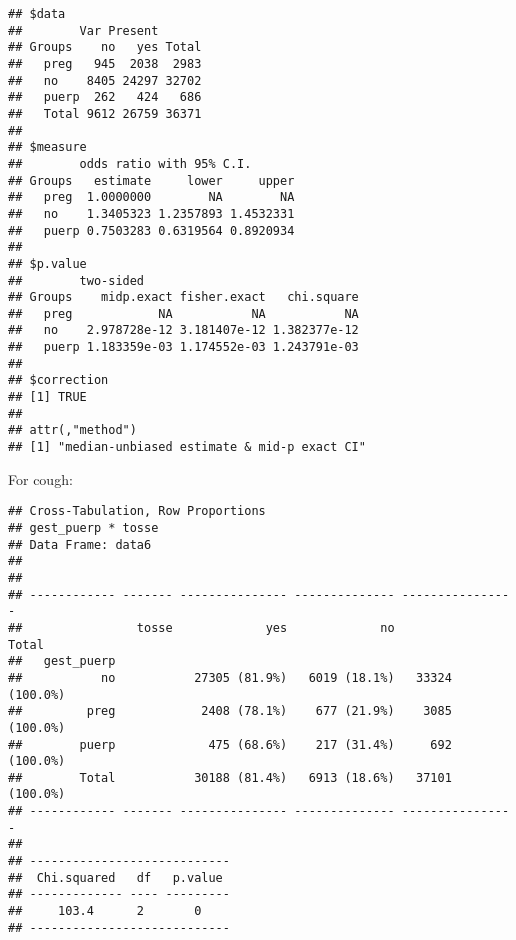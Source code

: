 \documentclass[
]{article}
\newenvironment{Shaded}{\begin{snugshade}}{\end{snugshade}}
\newcommand{\DataTypeTok}[1]{\textcolor[rgb]{0.13,0.29,0.53}{#1}}
\newcommand{\KeywordTok}[1]{\textcolor[rgb]{0.13,0.29,0.53}{\textbf{#1}}}
\newcommand{\NormalTok}[1]{#1}
\newcommand{\OperatorTok}[1]{\textcolor[rgb]{0.81,0.36,0.00}{\textbf{#1}}}
\newcommand{\OtherTok}[1]{\textcolor[rgb]{0.56,0.35,0.01}{#1}}
\newcommand{\StringTok}[1]{\textcolor[rgb]{0.31,0.60,0.02}{#1}}
\begin{document}
\begin{verbatim}
## $data
##        Var Present
## Groups    no   yes Total
##   preg   945  2038  2983
##   no    8405 24297 32702
##   puerp  262   424   686
##   Total 9612 26759 36371
## 
## $measure
##        odds ratio with 95% C.I.
## Groups   estimate     lower     upper
##   preg  1.0000000        NA        NA
##   no    1.3405323 1.2357893 1.4532331
##   puerp 0.7503283 0.6319564 0.8920934
## 
## $p.value
##        two-sided
## Groups    midp.exact fisher.exact   chi.square
##   preg            NA           NA           NA
##   no    2.978728e-12 3.181407e-12 1.382377e-12
##   puerp 1.183359e-03 1.174552e-03 1.243791e-03
## 
## $correction
## [1] TRUE
## 
## attr(,"method")
## [1] "median-unbiased estimate & mid-p exact CI"
\end{verbatim}

For cough:

\begin{Shaded}
\end{Shaded}

\begin{verbatim}
## Cross-Tabulation, Row Proportions  
## gest_puerp * tosse  
## Data Frame: data6  
## 
## 
## ------------ ------- --------------- -------------- ----------------
##                tosse             yes             no            Total
##   gest_puerp                                                        
##           no           27305 (81.9%)   6019 (18.1%)   33324 (100.0%)
##         preg            2408 (78.1%)    677 (21.9%)    3085 (100.0%)
##        puerp             475 (68.6%)    217 (31.4%)     692 (100.0%)
##        Total           30188 (81.4%)   6913 (18.6%)   37101 (100.0%)
## ------------ ------- --------------- -------------- ----------------
## 
## ----------------------------
##  Chi.squared   df   p.value 
## ------------- ---- ---------
##     103.4      2       0    
## ----------------------------
\end{verbatim}

\begin{Shaded}
\end{Shaded}
\end{document}
